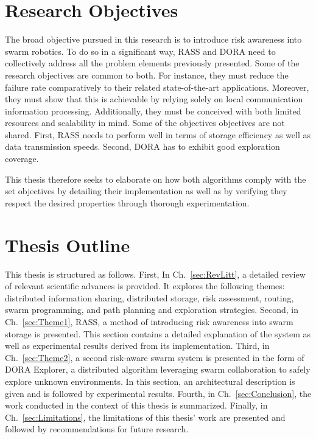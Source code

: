 \section{Research Objectives}  %
The broad objective pursued in this research is to introduce risk awareness into swarm robotics. To do so in a significant way, \ac{RASS} and \ac{DORA} need to collectively address all the problem elements previously presented. Some of the research objectives are common to both. For instance, they must reduce the failure rate comparatively to their related state-of-the-art applications. Moreover, they must show that this is achievable by relying solely on local communication information processing. Additionally, they must be conceived with both limited resources and scalability in mind. Some of the objectives objectives are not shared. First, \ac{RASS} needs to perform well in terms of storage efficiency as well as data transmission speeds. Second, \ac{DORA} has to exhibit good exploration coverage.

This thesis therefore seeks to elaborate on how both algorithms comply with the set objectives by detailing their implementation as well as by verifying they respect the desired properties through thorough experimentation.


\section{Thesis Outline}  %
This thesis is structured as follows. First, In Ch.~\ref{sec:RevLitt}, a detailed review of relevant scientific advances is provided. It explores the following themes: distributed information sharing, distributed storage, risk assessment, routing, swarm programming, and path planning and exploration strategies. Second, in Ch.~\ref{sec:Theme1}, RASS, a method of introducing risk awareness into swarm storage is presented. This section contains a detailed explanation of the system as well as experimental results derived from its implementation. Third, in Ch.~\ref{sec:Theme2}, a second risk-aware swarm system is presented in the form of DORA Explorer, a distributed algorithm leveraging swarm collaboration to safely explore unknown environments. In this section, an architectural description is given and is followed by experimental results. Fourth, in Ch.~\ref{sec:Conclusion}, the work conducted in the context of this thesis is summarized. Finally, in Ch.~\ref{sec:Limitations}, the limitations of this thesis' work are presented and followed by recommendations for future research.